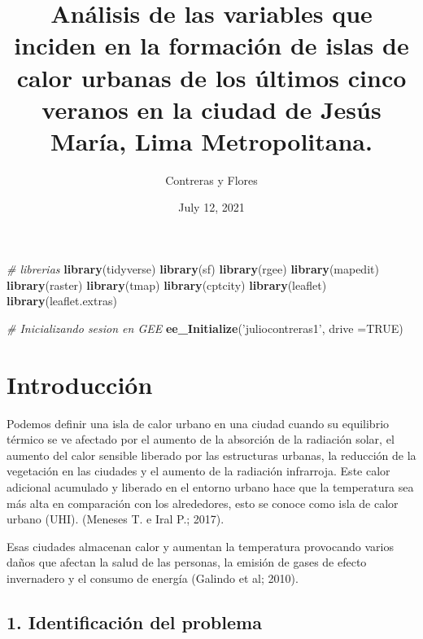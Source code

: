 \documentclass[
]{article}
\title{Análisis de las variables que inciden en la formación de islas de calor
urbanas de los últimos cinco veranos en la ciudad de Jesús María, Lima
Metropolitana.}
\author{Contreras y Flores}
\date{July 12, 2021}
\newenvironment{Shaded}{\begin{snugshade}}{\end{snugshade}}
\newcommand{\CommentTok}[1]{\textcolor[rgb]{0.56,0.35,0.01}{\textit{#1}}}
\newcommand{\DataTypeTok}[1]{\textcolor[rgb]{0.13,0.29,0.53}{#1}}
\newcommand{\KeywordTok}[1]{\textcolor[rgb]{0.13,0.29,0.53}{\textbf{#1}}}
\newcommand{\NormalTok}[1]{#1}
\newcommand{\OtherTok}[1]{\textcolor[rgb]{0.56,0.35,0.01}{#1}}
\newcommand{\StringTok}[1]{\textcolor[rgb]{0.31,0.60,0.02}{#1}}
\begin{document}
\maketitle

{
\setcounter{tocdepth}{3}
\tableofcontents
}
\begin{Shaded}
\begin{Highlighting}[]
\CommentTok{# librerias}
\KeywordTok{library}\NormalTok{(tidyverse)}
\KeywordTok{library}\NormalTok{(sf)}
\KeywordTok{library}\NormalTok{(rgee)}
\KeywordTok{library}\NormalTok{(mapedit)}
\KeywordTok{library}\NormalTok{(raster)}
\KeywordTok{library}\NormalTok{(tmap)}
\KeywordTok{library}\NormalTok{(cptcity)}
\KeywordTok{library}\NormalTok{(leaflet)}
\KeywordTok{library}\NormalTok{(leaflet.extras)}
\end{Highlighting}
\end{Shaded}

\begin{Shaded}
\begin{Highlighting}[]
\CommentTok{# Inicializando sesion en GEE}
\KeywordTok{ee_Initialize}\NormalTok{(}\StringTok{'juliocontreras1'}\NormalTok{, }\DataTypeTok{drive =}\OtherTok{TRUE}\NormalTok{)}
\end{Highlighting}
\end{Shaded}

\hypertarget{introducciuxf3n}{%
\section{Introducción}\label{introducciuxf3n}}

Podemos definir una isla de calor urbano en una ciudad cuando su
equilibrio térmico se ve afectado por el aumento de la absorción de la
radiación solar, el aumento del calor sensible liberado por las
estructuras urbanas, la reducción de la vegetación en las ciudades y el
aumento de la radiación infrarroja. Este calor adicional acumulado y
liberado en el entorno urbano hace que la temperatura sea más alta en
comparación con los alrededores, esto se conoce como isla de calor
urbano (UHI). (Meneses T. e Iral P.; 2017).

Esas ciudades almacenan calor y aumentan la temperatura provocando
varios daños que afectan la salud de las personas, la emisión de gases
de efecto invernadero y el consumo de energía (Galindo et al; 2010).

\hypertarget{identificaciuxf3n-del-problema}{%
\subsection{1. Identificación del
problema}\label{identificaciuxf3n-del-problema}}
\end{document}
